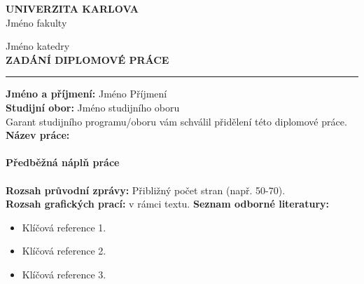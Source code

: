 
{
\pagestyle{empty}

\begin{center}
\textbf{UNIVERZITA KARLOVA}\\
Jméno fakulty

Jméno katedry\\[10mm]
{\large\textbf{ZADÁNÍ DIPLOMOVÉ PRÁCE}}
\end{center}

\vspace{4mm}
\noindent\rule{\textwidth}{0.4pt}
\vspace{4mm}

\noindent\textbf{Jméno a příjmení:} Jméno Příjmení \\[2mm]
\noindent\textbf{Studijní obor:} Jméno studijního oboru\\[2mm]
\noindent Garant studijního programu/oboru vám schválil přidělení této diplomové práce.\\[6mm]

\noindent\textbf{Název práce:}\\[2mm]
\noindent{}\\[6mm]

\noindent\textbf{Předběžná náplň práce}\\[2mm]
\noindent{}\\[6mm]
\noindent\textbf{Rozsah průvodní zprávy:} Přibližný počet stran (např. 50-70).\\[2mm]
\noindent\textbf{Rozsah grafických prací:} v rámci textu.
\newpage
\noindent\textbf{Seznam odborné literatury:}\\[2mm]
\begin{itemize}\setlength{\itemsep}{4mm}
  \item Klíčová reference 1.
  \item Klíčová reference 2.
  \item Klíčová reference 3.
\end{itemize}
\vspace{8mm}

}
